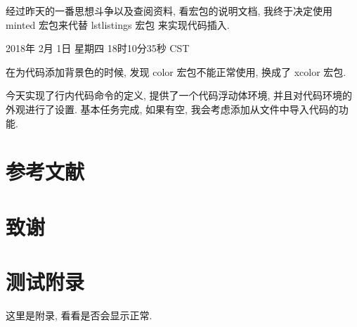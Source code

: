 \documentclass{cugrep}
\begin{document}
经过昨天的一番思想斗争以及查阅资料, 看宏包的说明文档, 我终于决定使用 minted 宏包来代替 lstlistings 宏包
来实现代码插入.

2018年 2月 1日 星期四 18时10分35秒 CST

在为代码添加背景色的时候, 发现 color 宏包不能正常使用, 换成了 xcolor 宏包. 

今天实现了行内代码命令的定义, 提供了一个代码浮动体环境,
并且对代码环境的外观进行了设置. 基本任务完成, 如果有空,
我会考虑添加从文件中导入代码的功能.


\backmatter
\chapter{参考文献}
\chapter{致谢}
\appendix
\chapter{测试附录}
这里是附录, 看看是否会显示正常.

\backmatter 
\end{document}
